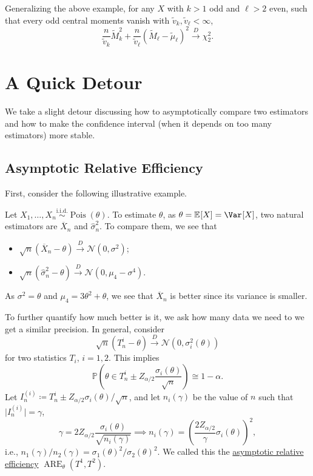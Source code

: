 Generalizing the above example, for any \(X\) with \(k > 1\) odd and \(\ell > 2\) even, such that every odd central moments vanish with \(\widetilde{v} _k , \widetilde{v} _\ell < \infty \),
\[
	\frac{n}{\widetilde{v} _k} \widetilde{M} _k^2 + \frac{n}{\widetilde{v} _\ell }(\widetilde{M} _\ell - \widetilde{\mu} _\ell )^2 \overset{D}{\to} \chi _2^2 .
\]

\section{A Quick Detour}
We take a slight detour discussing how to asymptotically compare two estimators and how to make the confidence interval (when it depends on too many estimators) more stable.

\subsection{Asymptotic Relative Efficiency}
First, consider the following illustrative example.

\begin{eg}\label{eg:ARE}
	Let \(X_1, \dots , X_n \overset{\text{i.i.d.} }{\sim } \operatorname{Pois}(\theta ) \). To estimate \(\theta \), as \(\theta = \mathbb{E}_{}[X] = \Var_{}[X] \), two natural estimators are \(\overline{X} _n\) and \(\hat{\sigma} _n^2\). To compare them, we see that
	\begin{itemize}
		\item \(\sqrt{n} (\overline{X} _n - \theta ) \overset{D}{\to} \mathcal{N} (0, \sigma ^2)\);
		\item \(\sqrt{n} (\hat{\sigma} _n^2 - \theta ) \overset{D}{\to} \mathcal{N} (0, \mu _4 - \sigma ^4)\).
	\end{itemize}
	As \(\sigma ^2 = \theta \) and \(\mu _4 = 3 \theta ^2 + \theta \), we see that \(\overline{X} _n\) is better since its variance is smaller.
\end{eg}

To further quantify how much better is it, we ask how many data we need to we get a similar precision. In general, consider
\[
	\sqrt{n} (T_n^i - \theta )
	\overset{D}{\to} \mathcal{N} (0, \sigma _i^2(\theta ))
\]
for two statistics \(T_i\), \(i = 1, 2\). This implies
\[
	\mathbb{P} \left( \theta \in T_n^i \pm Z_{\alpha / 2} \frac{\sigma _i(\theta )}{\sqrt{n} } \right) \cong 1 - \alpha .
\]
Let \(I_n^{(i)} \coloneqq T_n^i \pm Z_{\alpha / 2} \sigma _i(\theta ) / \sqrt{n} \), and let \(n_i(\gamma )\) be the value of \(n\) such that \(\vert I_n^{(i)} \vert = \gamma \),
\[
	\gamma = 2 Z_{\alpha / 2} \frac{\sigma _i(\theta )}{\sqrt{n_i (\gamma )} }
	\implies n_i(\gamma ) = \left( \frac{2 Z_{\alpha / 2}}{\gamma } \sigma _i(\theta ) \right)^2 ,
\]
i.e., \(n_1(\gamma ) / n_2(\gamma ) = \sigma _1(\theta )^2 / \sigma _2(\theta )^2\). We called this the \hyperref[def:asymptotic-relative-efficiency]{asymptotic relative efficiency} \(\operatorname{ARE}_\theta (T^1, T^2) \).

